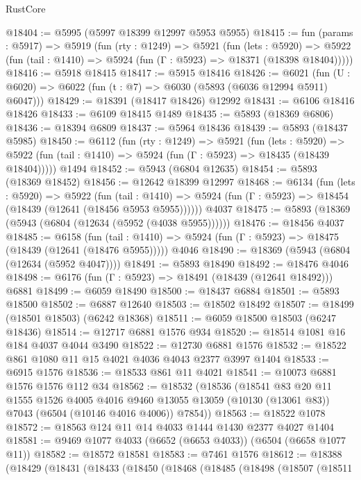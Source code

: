 \begin{lexlean}{RustCore}
\begin{coremodule}
@18404 := @5995 (@5997 @18399 @12997 @5953 @5955)
@18415 := fun (params : @5917) =>
  @5919
    (fun (rty : @1249) =>
    @5921
      (fun (lets : @5920) =>
      @5922 (fun (tail : @1410) => @5924 (fun (Γ : @5923) => @18371 (@18398 @18404)))))
@18416 := @5918 @18415
@18417 := @5915 @18416
@18426 := @6021
    (fun (U : @6020) => @6022 (fun (t : @7) => @6030 (@5893 (@6036 @12994 @5911) @6047)))
@18429 := @18391 (@18417 @18426) @12992
@18431 := @6106 @18416 @18426
@18433 := @6109 @18415 @1489
@18435 := @5893 (@18369 @6806)
@18436 := @18394 @6809
@18437 := @5964 @18436
@18439 := @5893 (@18437 @5985)
@18450 := @6112
    (fun (rty : @1249) =>
    @5921
      (fun (lets : @5920) =>
      @5922 (fun (tail : @1410) => @5924 (fun (Γ : @5923) => @18435 (@18439 @18404)))))
    @1494
@18452 := @5943 (@6804 @12635)
@18454 := @5893 (@18369 @18452)
@18456 := @12642 @18399 @12997
@18468 := @6134
    (fun (lets : @5920) =>
    @5922
      (fun (tail : @1410) =>
      @5924 (fun (Γ : @5923) => @18454 (@18439 (@12641 (@18456 @5953 @5955))))))
    @4037
@18475 := @5893 (@18369 (@5943 (@6804 (@12634 (@5952 (@4038 @5955))))))
@18476 := @18456 @4037
@18485 := @6158
    (fun (tail : @1410) => @5924 (fun (Γ : @5923) => @18475 (@18439 (@12641 (@18476 @5955)))))
    @4046
@18490 := @18369 (@5943 (@6804 (@12634 (@5952 @4047))))
@18491 := @5893 @18490
@18492 := @18476 @4046
@18498 := @6176 (fun (Γ : @5923) => @18491 (@18439 (@12641 @18492))) @6881
@18499 := @6059 @18490
@18500 := @18437 @6884
@18501 := @5893 @18500
@18502 := @6887 @12640
@18503 := @18502 @18492
@18507 := @18499 (@18501 @18503) (@6242 @18368)
@18511 := @6059 @18500 @18503 (@6247 @18436)
@18514 := @12717 @6881 @1576 @934
@18520 := @18514 @1081 @16 @184 @4037 @4044 @3490
@18522 := @12730 @6881 @1576
@18532 := @18522 @861 @1080 @11 @15 @4021 @4036 @4043 @2377 @3997 @1404
@18533 := @6915 @1576
@18536 := @18533 @861 @11 @4021
@18541 := @10073 @6881 @1576 @1576 @112 @34
@18562 := @18532
    (@18536
      (@18541
        @83
        @20
        @11
        @1555
        @1526
        @4005
        @4016
        @9460
        @13055
        @13059
        (@10130 (@13061 @83))
        @7043
        (@6504 (@10146 @4016 @4006))
        @7854))
@18563 := @18522 @1078
@18572 := @18563 @124 @11 @14 @4033 @1444 @1430 @2377 @4027 @1404
@18581 := @9469 @1077 @4033 (@6652 (@6653 @4033)) (@6504 (@6658 @1077 @11))
@18582 := @18572 @18581
@18583 := @7461 @1576
@18612 := @18388
    (@18429
      (@18431
        (@18433
          (@18450
            (@18468
              (@18485
                (@18498
                  (@18507
                    (@18511

\end{coremodule}
\end{lexlean}
